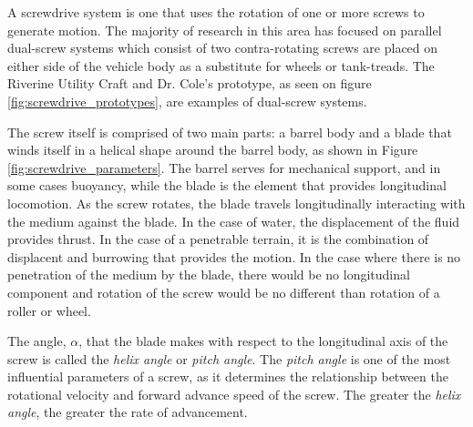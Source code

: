 
A screwdrive system is one that uses the rotation of one or more screws to generate motion. The majority of research in this area has focused on parallel dual-screw systems which consist of two contra-rotating screws are placed on either side of the vehicle body as a substitute for wheels or tank-treads. The Riverine Utility Craft and Dr. Cole's prototype, as seen on figure \ref{fig:screwdrive_prototypes}, are examples of dual-screw systems. 


The screw itself is comprised of two main parts: a barrel body and a blade that winds itself in a helical shape around the barrel body, as shown in Figure \ref{fig:screwdrive_parameters}. The barrel serves for mechanical support, and in some cases buoyancy, while the blade is the element that provides longitudinal locomotion. As the screw rotates, the blade travels longitudinally interacting with the medium against the blade. In the case of water, the displacement of the fluid provides thrust. In the case of a penetrable terrain, it is the combination of displacent and burrowing that provides the motion. In the case where there is no penetration of the medium by the blade, there would be no longitudinal component and rotation of the screw would be no different than rotation of a roller or wheel. 


The angle, \emph{\( \alpha \)}, that the blade makes with respect to the longitudinal axis of the screw is called the \emph{helix angle} or \emph{pitch angle}. The \emph{pitch angle} is one of the most influential parameters of a screw, as it determines the relationship between the rotational velocity and forward advance speed of the screw. The greater the \emph{helix angle}, the greater the rate of advancement. 



